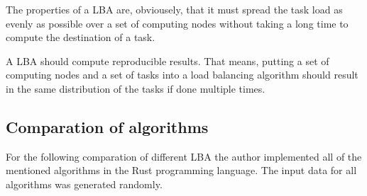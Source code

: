 The properties of a \ac{LBA} are, obviousely, that it must spread the task load
as evenly as possible over a set of computing nodes without taking a long time
to compute the destination of a task.

A \ac{LBA} should compute reproducible results.
That means, putting a set of computing nodes and a set of tasks into a load
balancing algorithm should result in the same distribution of the tasks if done
multiple times.

%

\subsection{Comparation of algorithms}

For the following comparation of different \ac{LBA} the author implemented all
of the mentioned algorithms in the Rust programming language.
The input data for all algorithms was generated randomly.

\label{sec:algo:comp}
